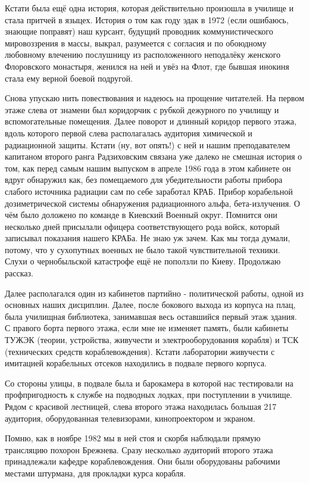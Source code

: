 Кстати
была ещё одна история, которая действительно произошла в училище и стала
притчей в языцех. История о том как году эдак в 1972 (если ошибаюсь, знающие
поправят) наш курсант, будущий проводник коммунистического мировоззрения в
массы, выкрал, разумеется с согласия и по обоюдному любовному влечению
послушницу из расположенного неподалёку женского Флоровского монастыря, женился
на ней и увёз на Флот, где бывшая инокиня стала ему верной боевой подругой.

Снова упускаю нить повествования и надеюсь на прощение читателей. На первом
этаже слева от знамени был коридорчик с рубкой дежурного по училищу и
вспомогательные помещения. Далее поворот и длинный коридор первого этажа, вдоль
которого первой слева располагалась аудитория химической и радиационной защиты.
Кстати (ну, вот опять!) с ней и нашим преподавателем капитаном второго ранга
Радзиховским связана уже далеко не смешная история о том, как перед самым нашим
выпуском в апреле 1986 года в этом кабинете он вдруг обнаружил как, без
помещаемого для убедительности работы прибора слабого источника радиации сам по
себе заработал КРАБ. Прибор корабельной дозиметрической системы обнаружения
радиационного альфа, бета-излучения. О чём было доложено по команде в Киевский
Военный округ. Помнится они несколько дней присылали офицера соответствующего
рода войск, который записывал показания нашего КРАБа. Не знаю уж зачем. Как мы
тогда думали, потому, что у сухопутных военных не было такой чувствительной
техники. Слухи о чернобыльской катастрофе ещё не поползли по Киеву. Продолжаю
рассказ. 

Далее располагался один из кабинетов партийно - политической работы,
одной из основных наших дисциплин. Далее, после бокового выхода из корпуса на
плац, была училищная библиотека, занимавшая весь оставшийся первый этаж здания.
С правого борта первого этажа, если мне не изменяет память, были кабинеты ТУЖЭК
(теории, устройства, живучести и электрооборудования корабля) и ТСК
(технических средств кораблевождения). Кстати лаборатории живучести с имитацией
корабельных отсеков находились в подвале первого корпуса. 

Со стороны улицы, в подвале была и барокамера в которой нас тестировали на
профпригодность к службе на подводных лодках, при поступлении в училище. Рядом
с красивой лестницей, слева второго этажа находилась большая 217 аудитория,
оборудованная телевизорами, кинопроектором и экраном. 

Помню, как в ноябре 1982 мы в ней стоя и скорбя наблюдали прямую трансляцию
похорон Брежнева. Сразу несколько аудиторий второго этажа принадлежали кафедре
кораблевождения. Они были оборудованы рабочими местами штурмана, для прокладки
курса корабля. 

